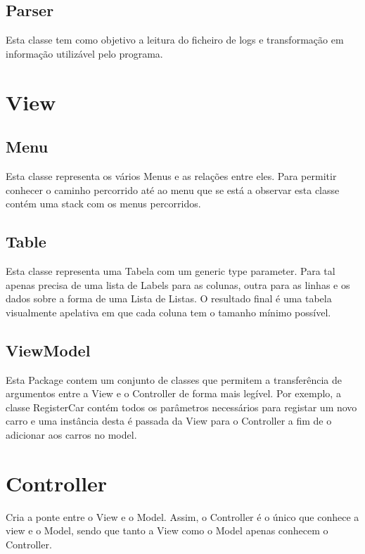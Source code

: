 \documentclass[a4paper]{report}
\begin{document}
\subsection{Parser}

Esta classe tem como objetivo a leitura do ficheiro de logs e transformação
em informação utilizável pelo programa.

\section{View}

\subsection{Menu}

Esta classe representa os vários Menus e as relações entre eles. Para permitir
conhecer o caminho percorrido até ao menu que se está a observar esta classe
contém uma stack com os menus percorridos.

\subsection{Table}

Esta classe representa uma Tabela com um generic type parameter. Para tal
apenas precisa de uma lista de Labels para as colunas, outra para as linhas e
os dados sobre a forma de uma Lista de Listas.
O resultado final é uma tabela visualmente apelativa em que cada coluna tem o
tamanho mínimo possível.

\subsection{ViewModel}

Esta Package contem um conjunto de classes que permitem a transferência de argumentos
entre a View e o Controller de forma mais legível. Por exemplo, a classe RegisterCar
contém todos os parâmetros necessários para registar um novo carro e uma instância desta
é passada da View para o Controller a fim de o adicionar aos carros no model.

\section{Controller}

Cria a ponte entre o View e o Model. Assim, o Controller é o único que conhece a view e o
Model, sendo que tanto a View como o Model apenas conhecem o Controller.
\end{document}
